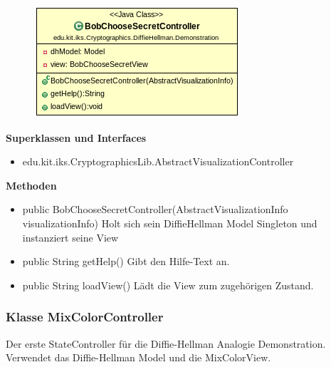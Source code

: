 \documentclass{article}
\begin{document}
      \begin{figure}[H]
        \centering
        \includegraphics[width=\textwidth]{resources/edu-kit-iks-Cryptographics-DiffieHellman-Demonstration-BobChooseSecretController}
      \end{figure}

      \textbf{Superklassen und Interfaces}
      \begin{itemize}
        \item edu.kit.iks.CryptographicsLib.AbstractVisualizationController
      \end{itemize}

      \textbf{Methoden}
      \begin{itemize}
          \item public BobChooseSecretController(AbstractVisualizationInfo visualizationInfo) \newline
              Holt sich sein DiffieHellman Model Singleton und instanziert seine View
        \item public String getHelp() \newline
        Gibt den Hilfe-Text an.
        \item public String loadView() \newline
        Lädt die View zum zugehörigen Zustand.
      \end{itemize}
\subsubsection{Klasse MixColorController}
      Der erste StateController für die Diffie-Hellman Analogie Demonstration.
      Verwendet das Diffie-Hellman Model und die MixColorView.
\end{document}
